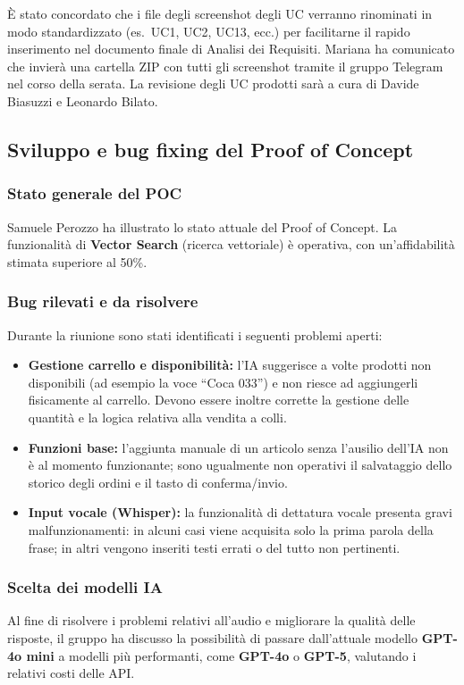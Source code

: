 \documentclass[a4paper, 11pt, oneside]{scrartcl}
\begin{document}
È stato concordato che i file degli screenshot degli UC verranno rinominati in modo standardizzato (es.\ UC1, UC2, UC13, ecc.) per facilitarne il rapido inserimento nel documento finale di Analisi dei Requisiti. Mariana ha comunicato che invierà una cartella ZIP con tutti gli screenshot tramite il gruppo Telegram nel corso della serata. La revisione degli UC prodotti sarà a cura di Davide Biasuzzi e Leonardo Bilato.

\subsection{Sviluppo e bug fixing del Proof of Concept}
\subsubsection{Stato generale del POC}
Samuele Perozzo ha illustrato lo stato attuale del Proof of Concept. La funzionalità di \textbf{Vector Search} (ricerca vettoriale) è operativa, con un'affidabilità stimata superiore al 50\%.

\subsubsection{Bug rilevati e da risolvere}
Durante la riunione sono stati identificati i seguenti problemi aperti:
\begin{itemize}
    \item \textbf{Gestione carrello e disponibilità:} l'IA suggerisce a volte prodotti non disponibili (ad esempio la voce ``Coca 033'') e non riesce ad aggiungerli fisicamente al carrello. Devono essere inoltre corrette la gestione delle quantità e la logica relativa alla vendita a colli.
    \item \textbf{Funzioni base:} l'aggiunta manuale di un articolo senza l'ausilio dell'IA non è al momento funzionante; sono ugualmente non operativi il salvataggio dello storico degli ordini e il tasto di conferma/invio.
    \item \textbf{Input vocale (Whisper):} la funzionalità di dettatura vocale presenta gravi malfunzionamenti: in alcuni casi viene acquisita solo la prima parola della frase; in altri vengono inseriti testi errati o del tutto non pertinenti.
\end{itemize}

\subsubsection{Scelta dei modelli IA}
Al fine di risolvere i problemi relativi all'audio e migliorare la qualità delle risposte, il gruppo ha discusso la possibilità di passare dall'attuale modello \textbf{GPT-4o mini} a modelli più performanti, come \textbf{GPT-4o} o \textbf{GPT-5}, valutando i relativi costi delle API.
\end{document}
